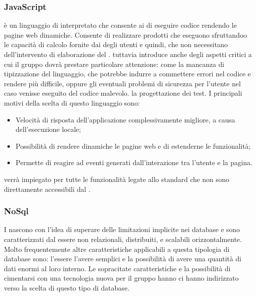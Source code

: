 \documentclass[12pt,a4paper]{article}
\begin{document}
\subsubsection{JavaScript}
 è un linguaggio di  interpretato che consente ai  di eseguire codice rendendo le pagine web dinamiche. Consente di realizzare prodotti  che eseguono sfruttandoo le capacità di calcolo fornite dai  degli utenti e quindi, che non necessitano dell’intervento di elaborazione del .  tuttavia introduce anche degli aspetti critici a cui il gruppo dovrà prestare particolare attenzione: come la mancanza di tipizzazione del linguaggio, che potrebbe indurre a commettere errori nel codice e rendere più difficile, oppure gli eventuali problemi di sicurezza per l'utente nel caso venisse eseguito del codice malevolo.
la progettazione dei test.
I principali motivi della scelta di questo linguaggio sono:
\begin{itemize}
	\item Velocità di risposta dell’applicazione complessivamente migliore, a causa dell’esecuzione locale;
	\item Possibilità di rendere dinamiche le pagine web e di estenderne le funzionalità;
	\item Permette di reagire ad eventi generati dall’interazione tra l’utente e la pagina.
\end{itemize}
 verrà impiegato per tutte le funzionalità legate allo standard  che non sono direttamente accessibili dal  .



\subsubsection{NoSql}\label{nosql}
I   nascono con l'idea di superare delle limitazioni implicite nei database  e sono caratterizzati dal essere non relazionali, distribuiti,  e scalabili orizzontalmente.
Molto frequentemente altre caratteristiche applicabili a questa tipologia di database sono: l'essere  l'avere  semplici e la possibilità di avere una quantità di dati enormi al loro interno.
Le sopracitate caratteristiche e la possibilità di cimentarsi con una tecnologia nuova per il gruppo hanno ci hanno indirizzato verso la scelta di questo tipo di database.
\end{document}
